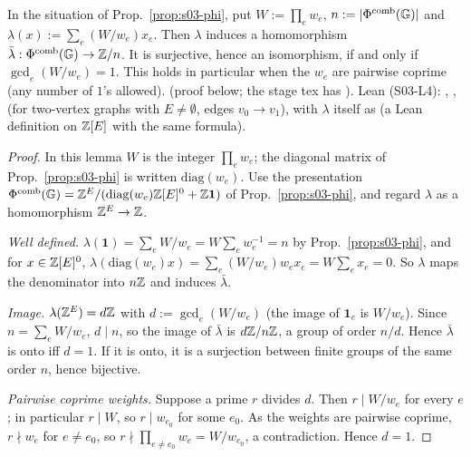 \begin{lemma}[cyclicity]\label{lem:s03-cyclic}
In the situation of Prop.~\ref{prop:s03-phi}, put $W:=\prod_ew_e$, $n:=|\Phi^{\mathrm{comb}}(\mathbb{G})|$ and $\lambda(x):=\sum_e(W/w_e)x_e$. Then
$\lambda$ induces a homomorphism $\bar\lambda:\Phi^{\mathrm{comb}}(\mathbb{G})\to\mathbb{Z}/n$. It is surjective, hence an isomorphism, if and only if
$\gcd_e(W/w_e)=1$. This holds in particular when the $w_e$ are pairwise coprime (any number of $1$'s allowed). \stproved{} (proof below;
the stage tex has \sttoprove). Lean (S03-L4): ,
,  \stformal{}
(for two-vertex graphs with $E\ne\emptyset$, edges $v_0\to v_1$), with $\lambda$ itself as  \stformal{} (a Lean definition on $\mathbb{Z}[E]$ with the
same formula).
\end{lemma}
\begin{proof}
In this lemma $W$ is the integer $\prod_ew_e$; the diagonal matrix of Prop.~\ref{prop:s03-phi} is written $\mathrm{diag}(w_e)$. Use the presentation
$\Phi^{\mathrm{comb}}(\mathbb{G})=\mathbb{Z}^E/(\mathrm{diag}(w_e)\mathbb{Z}[E]^0+\mathbb{Z}\mathbf 1)$ of Prop.~\ref{prop:s03-phi}, and regard $\lambda$ as a homomorphism $\mathbb{Z}^E\to\mathbb{Z}$.

\emph{Well defined.} $\lambda(\mathbf 1)=\sum_eW/w_e=W\sum_ew_e^{-1}=n$ by Prop.~\ref{prop:s03-phi}, and for $x\in\mathbb{Z}[E]^0$,
$\lambda(\mathrm{diag}(w_e)x)=\sum_e(W/w_e)w_ex_e=W\sum_ex_e=0$. So $\lambda$ maps the denominator into $n\mathbb{Z}$ and induces $\bar\lambda$.

\emph{Image.} $\lambda(\mathbb{Z}^E)=d\mathbb{Z}$ with $d:=\gcd_e(W/w_e)$ (the image of $\mathbf 1_e$ is $W/w_e$). Since $n=\sum_eW/w_e$, $d\mid n$, so the image of
$\bar\lambda$ is $d\mathbb{Z}/n\mathbb{Z}$, a group of order $n/d$. Hence $\bar\lambda$ is onto iff $d=1$. If it is onto, it is a surjection between finite groups of the same
order $n$, hence bijective.

\emph{Pairwise coprime weights.} Suppose a prime $r$ divides $d$. Then $r\mid W/w_e$ for every $e$; in particular $r\mid W$, so $r\mid w_{e_0}$ for some
$e_0$. As the weights are pairwise coprime, $r\nmid w_e$ for $e\ne e_0$, so $r\nmid\prod_{e\ne e_0}w_e=W/w_{e_0}$, a contradiction. Hence $d=1$.
\end{proof}

